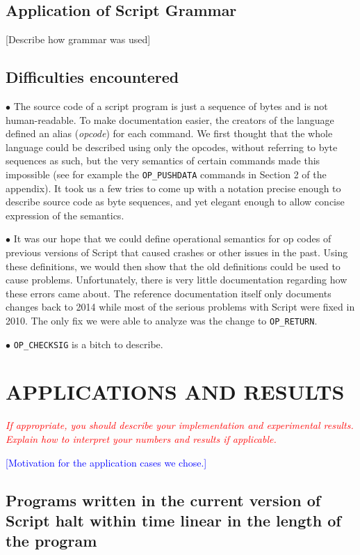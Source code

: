 \documentclass[letterpaper, 10 pt, conference]{ieeeconf}
\begin{document}
\subsection{Application of Script Grammar}

[Describe how grammar was used]

\subsection{Difficulties encountered}

$\bullet$ The source code of a script program is just a sequence of bytes and is not human-readable. To make documentation easier, the creators of the language defined an alias (\textit{opcode}) for each command. We first thought that the whole language could be described using only the opcodes, without referring to byte sequences as such, but the very semantics of certain commands made this impossible (see for example the \texttt{OP\_PUSHDATA} commands in Section 2 of the appendix). It took us a few tries to come up with a notation precise enough to describe source code as byte sequences, and yet elegant enough to allow concise expression of the semantics.

$\bullet$ It was our hope that we could define operational semantics for op codes of previous versions of Script that caused crashes or other issues in the past.  Using these definitions, we would then show that the old definitions could be used to cause problems.  Unfortunately, there is very little documentation regarding how these errors came about.  The reference documentation itself only documents changes back to 2014 while most of the serious problems with Script were fixed in 2010. The only fix we were able to analyze was the change to \texttt{OP\_RETURN}.

$\bullet$ \texttt{OP\_CHECKSIG} is a bitch to describe.  

\section{APPLICATIONS AND RESULTS}

 \textcolor{red}{\textit{If appropriate, you should describe your implementation and experimental results. Explain how to interpret your numbers and results if applicable.}}

\textcolor{blue}{[Motivation for the application cases we chose.]}



\subsection{Programs written in the current version of Script halt within time linear in the length of the program}
\end{document}
